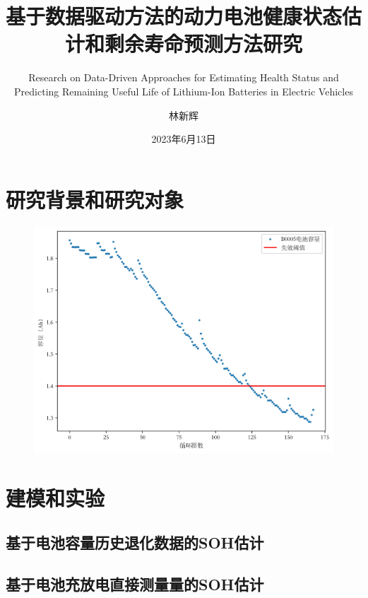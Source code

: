 \documentclass{beamer}
\author{林新辉}
\title{基于数据驱动方法的动力电池健康状态估计和剩余寿命预测方法研究}
\subtitle{Research on Data-Driven Approaches for Estimating Health Status and Predicting Remaining Useful Life of Lithium-Ion Batteries in Electric Vehicles}
\institute{控制与计算机工程学院，华北电力大学}
\date{2023年6月13日}
\begin{document}
\kaishu
\begin{frame}
\titlepage
\end{frame}
\begin{frame}
\tableofcontents[sectionstyle=show,subsectionstyle=show/shaded/hide,subsubsectionstyle=show/shaded/hide]
\end{frame}

\section{研究背景和研究对象}

\begin{frame}
	\begin{figure}[htbp]
		\includegraphics[scale=0.5]{figures/nasa_B0005_failure_threshold.jpg}
	\end{figure}
\end{frame}

\section{建模和实验}

\subsection{基于电池容量历史退化数据的SOH估计}

\subsection{基于电池充放电直接测量量的SOH估计}
\end{document}

